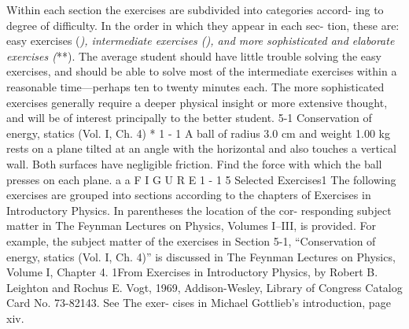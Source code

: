 \documentclass[11pt,oneside]{article}
\begin{document}


\label{tips-sec-13-5-selected-exercises}


Within each section the exercises are subdivided into categories accord- ing to degree of difficulty. In the order in which they appear in each sec- tion, these are: easy exercises (\emph{), intermediate exercises (}\emph{), and more sophisticated and elaborate exercises (}**). The average student should have little trouble solving the easy exercises, and should be able to solve most of the intermediate exercises within a reasonable time---perhaps ten to twenty minutes each. The more sophisticated exercises generally require a deeper physical insight or more extensive thought, and will be of interest principally to the better student. 5-1 Conservation of energy, statics (Vol. I, Ch. 4) * 1 - 1 A ball of radius 3.0 cm and weight 1.00 kg rests on a plane tilted at an angle with the horizontal and also touches a vertical wall. Both surfaces have negligible friction. Find the force with which the ball presses on each plane. a a F I G U R E  1 - 1 5 Selected Exercises1 The following exercises are grouped into sections according to the chapters of Exercises in Introductory Physics. In parentheses the location of the cor- responding subject matter in The Feynman Lectures on Physics, Volumes I–III, is provided. For example, the subject matter of the exercises in Section 5-1, “Conservation of energy, statics (Vol. I, Ch. 4)” is discussed in The Feynman Lectures on Physics, Volume I, Chapter 4. 1From Exercises in Introductory Physics, by Robert B. Leighton and Rochus E. Vogt, 1969, Addison-Wesley, Library of Congress Catalog Card No. 73-82143. See The exer- cises in Michael Gottlieb’s introduction, page xiv.\par
\end{document}
